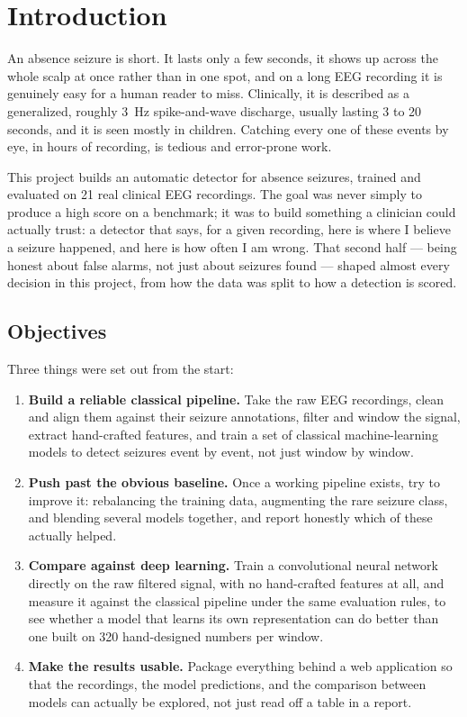 \chapter{Introduction}
\label{chap:introduction}

An absence seizure is short. It lasts only a few seconds, it shows up across the whole scalp
at once rather than in one spot, and on a long EEG recording it is genuinely easy for a human
reader to miss. Clinically, it is described as a generalized, roughly 3~Hz spike-and-wave
discharge, usually lasting 3 to 20 seconds, and it is seen mostly in children. Catching every
one of these events by eye, in hours of recording, is tedious and error-prone work.

This project builds an automatic detector for absence seizures, trained and evaluated on 21
real clinical EEG recordings. The goal was never simply to produce a high score on a benchmark;
it was to build something a clinician could actually trust: a detector that says, for a given
recording, here is where I believe a seizure happened, and here is how often I am wrong. That
second half --- being honest about false alarms, not just about seizures found --- shaped
almost every decision in this project, from how the data was split to how a detection is
scored.

\section{Objectives}

Three things were set out from the start:

\begin{enumerate}[leftmargin=1.4em]
  \item \textbf{Build a reliable classical pipeline.} Take the raw EEG recordings, clean and
    align them against their seizure annotations, filter and window the signal, extract
    hand-crafted features, and train a set of classical machine-learning models to detect
    seizures event by event, not just window by window.
  \item \textbf{Push past the obvious baseline.} Once a working pipeline exists, try to improve
    it: rebalancing the training data, augmenting the rare seizure class, and blending several
    models together, and report honestly which of these actually helped.
  \item \textbf{Compare against deep learning.} Train a convolutional neural network directly on
    the raw filtered signal, with no hand-crafted features at all, and measure it against the
    classical pipeline under the same evaluation rules, to see whether a model that learns its
    own representation can do better than one built on 320 hand-designed numbers per window.
  \item \textbf{Make the results usable.} Package everything behind a web application so that
    the recordings, the model predictions, and the comparison between models can actually be
    explored, not just read off a table in a report.
\end{enumerate}

